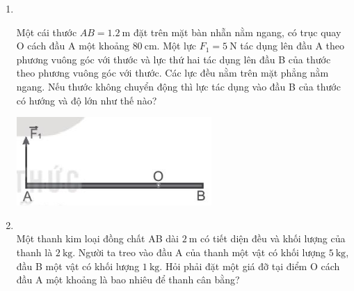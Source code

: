 \begin{enumerate}[label=\bfseries Câu \arabic*:, leftmargin=1.5cm]
	
	\item {}\\
	{Một cái thước $AB=\SI{1.2}{\meter}$ đặt trên mặt bàn nhẵn nằm ngang, có trục quay O cách đầu A một khoảng $\SI{80}{\centi\meter}$. Một lực $F_1=\SI{5}{\newton}$ tác dụng lên đầu A theo phương vuông góc với thước và lực thứ hai tác dụng lên đầu B của thước theo phương vuông góc với thước. Các lực đều nằm trên mặt phẳng nằm ngang. Nếu thước không chuyển động thì lực tác dụng vào đầu B của thước có hướng và độ lớn như thế nào?
		\begin{center}
			\includegraphics[width=0.35\linewidth]{../figs/VN10-2022-PH-TP023-P-8}
		\end{center}
	
}

\item {}\\
{Một thanh kim loại đồng chất AB dài $\SI{2}{\meter}$ có tiết diện đều và khối lượng của thanh là $\SI{2}{\kilo\gram}$. Người ta treo vào đầu A của thanh một vật có khối lượng $\SI{5}{\kilogram}$, đầu B một vật có khối lượng $\SI{1}{\kilogram}$. Hỏi phải đặt một giá đỡ tại điểm O cách đầu A một khoảng là bao nhiêu để thanh cân bằng?
}


\end{enumerate}
